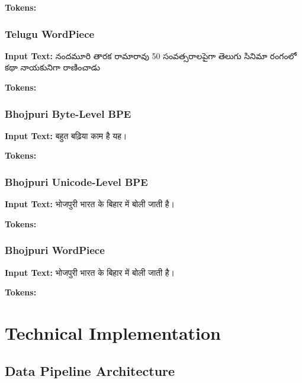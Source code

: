 \documentclass[11pt,a4paper]{article}
\begin{document}
\textbf{Tokens:} {\teluguFont ['నందమూరి ', 'తారక రామారావు ', '50', ' సంవత్సరాల', 'పైగా ', 'తెలుగు సినిమా ', 'రంగంలో ', 'కథా ', 'నాయకు', 'నిగా ', ...]}

\subsubsection{Telugu WordPiece}
\textbf{Input Text:} {\teluguFont నందమూరి తారక రామారావు 50 సంవత్సరాలపైగా తెలుగు సినిమా రంగంలో కథా నాయకునిగా రాణించాడు}

\textbf{Tokens:} {\teluguFont ['నందమూరి', 'తారక', 'రామారావు', '50', 'సంవత్సరాల', '##పైగా', 'తెలుగు', 'సినిమా', 'రంగంలో', 'కథా', '##న', '##గా', ...]}

\subsubsection{Bhojpuri Byte-Level BPE}
\textbf{Input Text:} {\devanagariFont बहुत बढ़िया काम है यह।}

\textbf{Tokens:} {\devanagariFont ['बहु', 'त', ' ', 'बढ', '़', 'िया', ' ', 'क', 'ाम', ' ', ...]}

\subsubsection{Bhojpuri Unicode-Level BPE}
\textbf{Input Text:} {\devanagariFont भोजपुरी भारत के बिहार में बोली जाती है।}

\textbf{Tokens:} {\devanagariFont ['भोजपुरी', ' ', 'भारत', ' ', 'के', ' ', 'बिहार', ' ', 'में', ' ', ...]}

\subsubsection{Bhojpuri WordPiece}
\textbf{Input Text:} {\devanagariFont भोजपुरी भारत के बिहार में बोली जाती है।}

\textbf{Tokens:} {\devanagariFont [भोजपुरी, भारत, के, बिहार, में, बोली, जाती, है, ।]}

\section{Technical Implementation}

\subsection{Data Pipeline Architecture}
\end{document}

